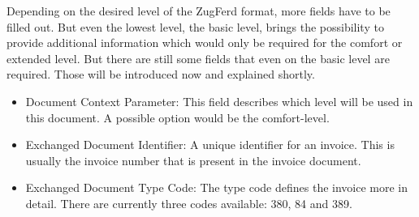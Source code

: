 Depending on the desired level of the ZugFerd format, more fields have to be filled out. But even the lowest level, the basic level, brings the possibility to provide additional information which would only be required for the comfort or extended level. But there are still some fields that even on the basic level are required. Those will be introduced now and explained shortly.
\begin{itemize}
	\item Document Context Parameter: This field describes which level will be used in this document. A possible option would be the comfort-level.
	\item Exchanged Document Identifier: A unique identifier for an invoice. This is usually the invoice number that is present in the invoice document.
	\item Exchanged Document Type Code: The type code defines the invoice more in detail. There are currently three codes available: 380, 84 and 389.
	

\end{itemize}
